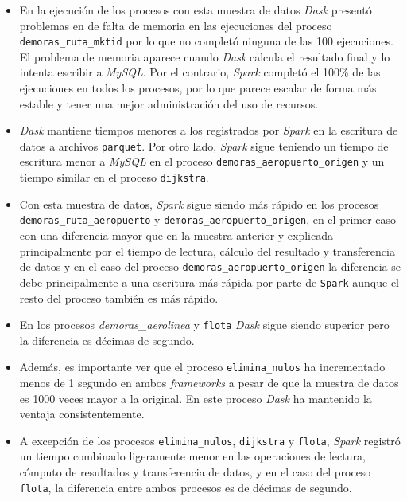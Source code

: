 \begin{itemize}

	\item En la ejecución de los procesos con esta muestra de datos \textit{Dask} presentó problemas en de falta de memoria en las ejecuciones del proceso \texttt{demoras\_ruta\_mktid} por lo que no completó ninguna de las 100 ejecuciones. El problema de memoria aparece cuando \textit{Dask} calcula el resultado final y lo intenta escribir a \textit{MySQL}. Por el contrario, \textit{Spark} completó el 100\% de las ejecuciones en todos los procesos, por lo que parece escalar de forma más estable y tener una mejor administración del uso de recursos.
	
	\item \textit{Dask} mantiene tiempos menores a los registrados por \textit{Spark} en la escritura de datos a archivos \texttt{parquet}. Por otro lado, \textit{Spark} sigue teniendo un tiempo de escritura menor a \textit{MySQL} en el proceso \texttt{demoras\_aeropuerto\_origen} y un tiempo similar en el proceso \texttt{dijkstra}.
	
	\item Con esta muestra de datos, \textit{Spark} sigue siendo más rápido en los procesos \texttt{demoras\_ruta\_aeropuerto} y \texttt{demoras\_aeropuerto\_origen}, en el primer caso con una diferencia mayor que en la muestra anterior y explicada principalmente por el tiempo de lectura, cálculo del resultado y transferencia de datos y en el caso del proceso \texttt{demoras\_aeropuerto\_origen} la diferencia se debe principalmente a una escritura más rápida por parte de \texttt{Spark} aunque el resto del proceso también es más rápido.
	
	\item En los procesos \textit{demoras\_aerolinea} y \texttt{flota} \textit{Dask} sigue siendo superior pero la diferencia es décimas de segundo.
	
	\item Además, es importante ver que el proceso \texttt{elimina\_nulos} ha incrementado menos de 1 segundo en ambos \textit{frameworks} a pesar de que la muestra de datos es 1000 veces mayor a la original. En este proceso \textit{Dask} ha mantenido la ventaja consistentemente.
	
	\item A excepción de los procesos \texttt{elimina\_nulos}, \texttt{dijkstra} y \texttt{flota}, \textit{Spark} registró un tiempo combinado ligeramente menor en las operaciones de lectura, cómputo de resultados y transferencia de datos, y en el caso del proceso \texttt{flota}, la diferencia entre ambos procesos es de décimas de segundo.
	

\end{itemize}
